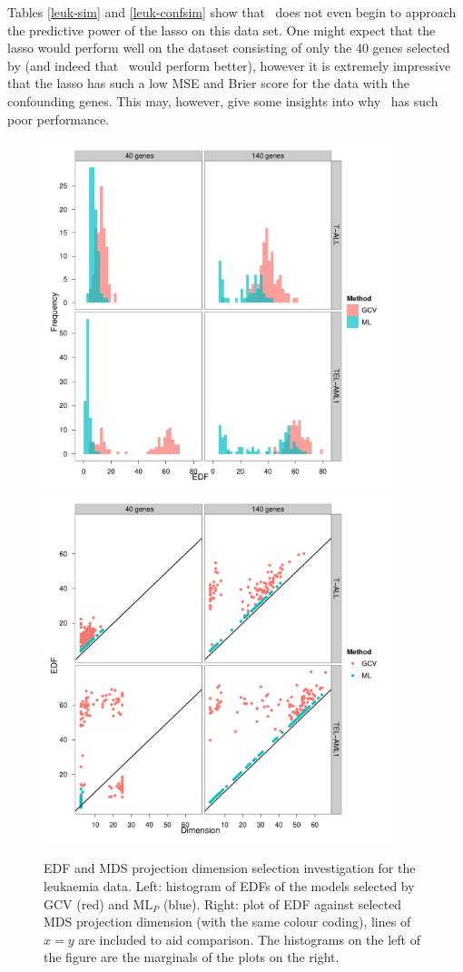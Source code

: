 Tables \ref{leuk-sim} and \ref{leuk-confsim} show that \mdsds\ does not even begin to approach the predictive power of the lasso on this data set. One might expect that the lasso would perform well on the dataset consisting of only the 40 genes selected by  (and indeed that \mdsds\ would perform better), however it is extremely impressive that the lasso has such a low MSE and Brier score for the data with the confounding genes. This may, however, give some insights into why \mdsds\ has such poor performance. 

\begin{figure}
\centering
\includegraphics[width=4in]{gds/figs/leuk-edf.pdf} \includegraphics[width=4in]{gds/figs/leuk-dim-edf.pdf} \\
\caption{EDF and MDS projection dimension selection investigation for the leukaemia data. Left: histogram of EDFs of the models selected by GCV (red) and $\text{ML}_P$ (blue). Right: plot of EDF against selected MDS projection dimension (with the same colour coding), lines of $x=y$ are included to aid comparison. The histograms on the left of the figure are the marginals of the plots on the right.}
\label{leuk-edf}
\end{figure}


